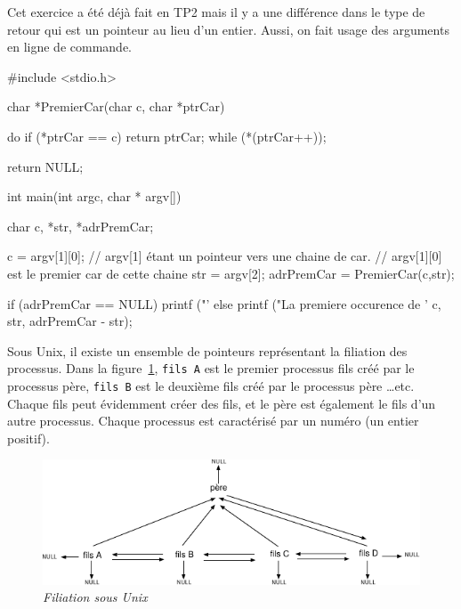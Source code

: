 \documentclass[10pt]{article}\usepackage[nu,correction]{esial}
\begin{document}
\begin{Reponse}
  Cet exercice a été déjà fait en TP2 mais il y a une différence dans
  le type de retour qui est un pointeur au lieu d'un entier. Aussi, on
  fait usage des arguments en ligne de commande.

\begin{boxedverbatim}
#include <stdio.h>

char *PremierCar(char c, char *ptrCar){
  do {
    if (*ptrCar == c)
      return ptrCar;
  } while (*(ptrCar++));

  return NULL;
}

int main(int argc, char * argv[]){

  char c, *str, *adrPremCar;

  c = argv[1][0]; // argv[1] étant un pointeur vers une chaine de car.
                  // argv[1][0] est le premier car de cette chaine
  str = argv[2];
  adrPremCar = PremierCar(c,str);

  if (adrPremCar == NULL) 
    printf ("'%
  else
    printf ("La premiere occurence de '%
            c, str, adrPremCar - str);
}
\end{boxedverbatim}
\end{Reponse}
    



\bigskip\bigskip{}

Sous Unix, il existe un ensemble de pointeurs représentant la
filiation des  processus. 
%
Dans la figure~\ref{filiation}, {\tt fils A} est le premier processus
fils créé par le processus père, {\tt fils B} est le deuxième fils
créé par le processus père \ldots etc.
Chaque fils peut évidemment créer des fils, et le père est également le
fils d'un autre processus.
%
Chaque processus est caractérisé par un numéro (un entier positif).

\bigskip\bigskip
\begin{figure}[h]
  \centerline{\includegraphics[width=\linewidth]{filiation.pdf}}
  \caption[]
	  {{\it Filiation sous Unix}}
	  \label{filiation}
\end{figure}
\bigskip
\end{document}

